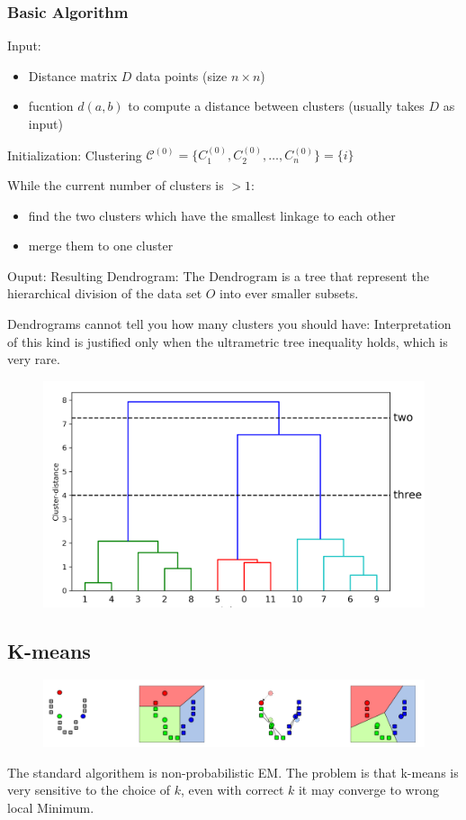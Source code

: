 \subsubsection{Basic Algorithm}
Input:
\begin{itemize}
    \item Distance matrix \(D\) data points (size \(n\times n\))
    \item fucntion \(d(a,b)\) to compute a distance between clusters (usually takes \(D\) as input)
\end{itemize}
Initialization: Clustering \(\mathcal{C}^{(0)} = \{C_1^{(0)},C_2^{(0)},\dots,C_n^{(0)}\} = \{i\}\)

While the current number of clusters is \(>1\):
\begin{itemize}
    \item find the two clusters which have the smallest linkage to each other
    \item merge them to one cluster
\end{itemize}
Ouput: Resulting Dendrogram: The Dendrogram is a tree that represent the hierarchical division of the data set \(O\) into ever smaller subsets.


Dendrograms cannot tell you how many clusters you should have: Interpretation of this kind is justified only when the ultrametric tree inequality holds, which is very rare.
\begin{figure}[!h]
    \includegraphics[width = \columnwidth]{figures/11/Dendrogram.png}
\end{figure}


\subsection{K-means}
\begin{figure}[!h]
    \includegraphics[width = \columnwidth]{figures/11/KMeansExample.png}
\end{figure}
The standard algorithem is non-probabilistic EM.
The problem is that k-means is very sensitive to the choice of \(k\), even with correct \(k\) it may converge to wrong local Minimum.
